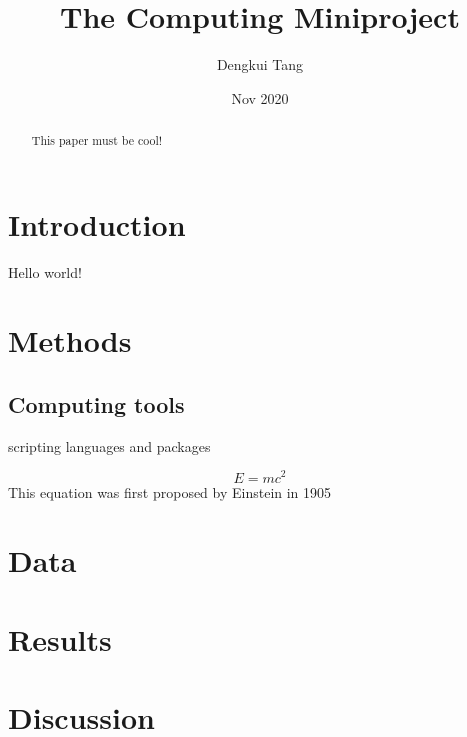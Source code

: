 \documentclass[11pt]{article}
\title{The Computing Miniproject}
\author{Dengkui Tang}
\date{Nov 2020}
\begin{document}
  \maketitle

  \begin{abstract}
    This paper must be cool!
  \end{abstract}

  \section{Introduction}
    Hello world!

  \section{Methods}
  
    \subsection{Computing tools}
    scripting languages and packages

  \begin{equation}
    E = mc^2
  \end{equation}
  This equation was first proposed by Einstein in 1905
  \cite{einstein1905does}

  \section{Data}

  \section{Results}

  \section{Discussion}

  
  
\end{document}
